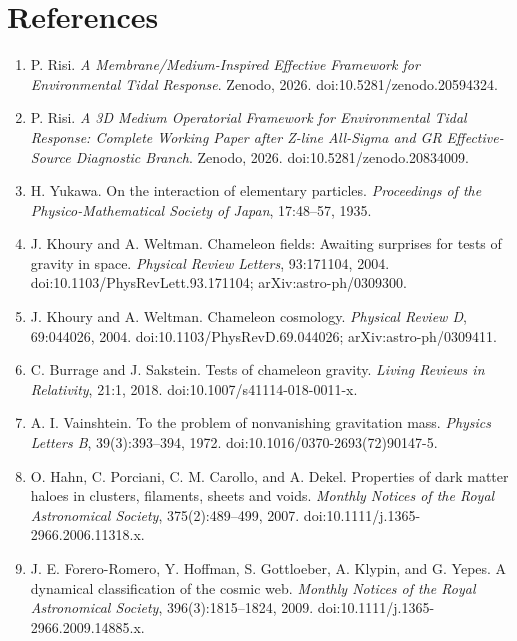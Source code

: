 \documentclass[11pt,a4paper]{article}
\begin{document}
\section*{References}
\begin{enumerate}[leftmargin=*,label={\arabic*.}]
\item P. Risi. \emph{A Membrane/Medium-Inspired Effective Framework for Environmental Tidal Response}. Zenodo, 2026. doi:10.5281/zenodo.20594324.
\item P. Risi. \emph{A 3D Medium Operatorial Framework for Environmental Tidal Response: Complete Working Paper after Z-line All-Sigma and GR Effective-Source Diagnostic Branch}. Zenodo, 2026. doi:10.5281/zenodo.20834009.
\item H. Yukawa. On the interaction of elementary particles. \emph{Proceedings of the Physico-Mathematical Society of Japan}, 17:48--57, 1935.
\item J. Khoury and A. Weltman. Chameleon fields: Awaiting surprises for tests of gravity in space. \emph{Physical Review Letters}, 93:171104, 2004. doi:10.1103/PhysRevLett.93.171104; arXiv:astro-ph/0309300.
\item J. Khoury and A. Weltman. Chameleon cosmology. \emph{Physical Review D}, 69:044026, 2004. doi:10.1103/PhysRevD.69.044026; arXiv:astro-ph/0309411.
\item C. Burrage and J. Sakstein. Tests of chameleon gravity. \emph{Living Reviews in Relativity}, 21:1, 2018. doi:10.1007/s41114-018-0011-x.
\item A. I. Vainshtein. To the problem of nonvanishing gravitation mass. \emph{Physics Letters B}, 39(3):393--394, 1972. doi:10.1016/0370-2693(72)90147-5.
\item O. Hahn, C. Porciani, C. M. Carollo, and A. Dekel. Properties of dark matter haloes in clusters, filaments, sheets and voids. \emph{Monthly Notices of the Royal Astronomical Society}, 375(2):489--499, 2007. doi:10.1111/j.1365-2966.2006.11318.x.
\item J. E. Forero-Romero, Y. Hoffman, S. Gottloeber, A. Klypin, and G. Yepes. A dynamical classification of the cosmic web. \emph{Monthly Notices of the Royal Astronomical Society}, 396(3):1815--1824, 2009. doi:10.1111/j.1365-2966.2009.14885.x.
\end{enumerate}
\end{document}
